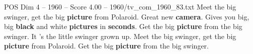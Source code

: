 \begin{textsample}{POS Dim 4 – 1960 – Score 4.00 – 1960/tv\_com\_1960\_83.txt}  \label{ex:f4_pos_002}
Meet the big swinger, get the big \textbf{picture} from Polaroid.
Great new \textbf{camera}.
Gives you big, big \textbf{black} and white \textbf{pictures} in \textbf{seconds}.
Get the big \textbf{picture} from the big swinger.
It 's the little swinger grown up.
Meet the big swinger, get the big \textbf{picture} from Polaroid.
Get the big \textbf{picture} from the big swinger.

\end{textsample}
